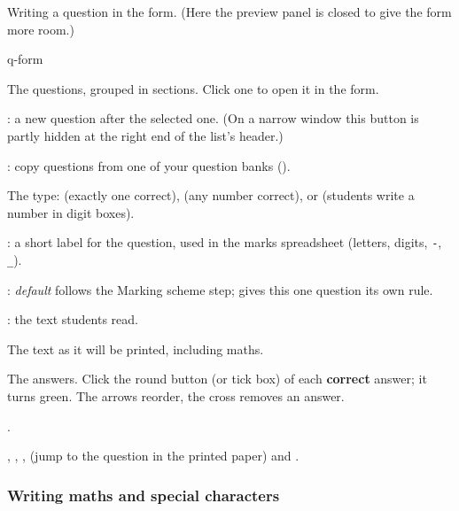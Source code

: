 \documentclass[11pt]{article}
\begin{document}
\begin{keep}
\begin{guidefig}{Writing a question in the form. (Here the preview panel is closed to give the form more room.)}
\begin{shot}[0.84\linewidth]{q-form}
\end{shot}
\end{guidefig}
\begin{callouts}
  \item The questions, grouped in sections. Click one to open it in the form.
  \item {}: a new question after the selected one. (On a narrow window this button is partly hidden at the right end of the list's header.)
  \item {}: copy questions from one of your question banks ().
  \item The type:  (exactly one correct),  (any number correct), or  (students write a number in digit boxes).
  \item {}: a short label for the question, used in the marks spreadsheet (letters, digits, \texttt{-}, \texttt{\_}).
  \item {}: \emph{default} follows the Marking scheme step;  gives this one question its own rule.
  \item {}: the text students read.
  \item The text as it will be printed, including maths.
  \item The answers. Click the round button (or tick box) of each \textbf{correct} answer; it turns green. The arrows reorder, the cross removes an answer.
  \item {}.
  \item {}, , ,  (jump to the question in the printed paper) and .
\end{callouts}
\end{keep}

\subsubsection{Writing maths and special characters}
\end{document}
